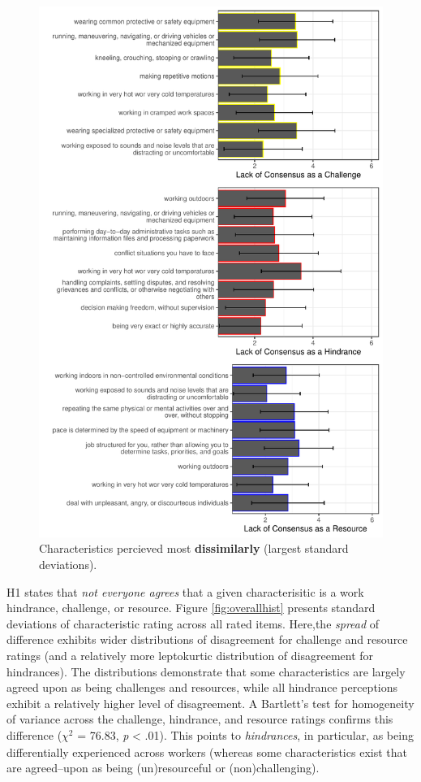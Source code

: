 \documentclass[
  man]{apa7}
\begin{document}
\begin{figure}
\centering
\includegraphics{Submission_files/figure-latex/combinegraphs2-1.pdf}
\caption{\label{fig:combinegraphs2}Characteristics percieved most \textbf{dissimilarly} (largest standard deviations).}
\end{figure}

H1 states that \emph{not everyone agrees} that a given characterisitic is a work hindrance, challenge, or resource. Figure \ref{fig:overallhist} presents standard deviations of characteristic rating across all rated items. Here,the \emph{spread} of difference exhibits wider distributions of disagreement for challenge and resource ratings (and a relatively more leptokurtic distribution of disagreement for hindrances). The distributions demonstrate that some characteristics are largely agreed upon as being challenges and resources, while all hindrance perceptions exhibit a relatively higher level of disagreement. A Bartlett's test for homogeneity of variance across the challenge, hindrance, and resource ratings confirms this difference (\(\chi^2_{}\) = 76.83, \emph{p} \textless{} .01). This points to \emph{hindrances}, in particular, as being differentially experienced across workers (whereas some characteristics exist that are agreed--upon as being (un)resourceful or (non)challenging).
\end{document}
